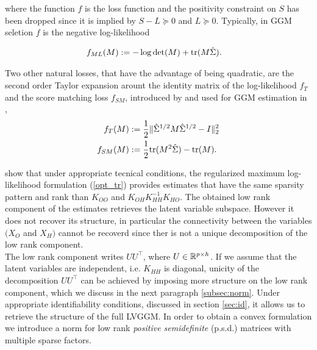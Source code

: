 where the function $f$ is the loss function and the positivity constraint on $S$ has been dropped since it is implied by $S-L \succeq 0$ and $L \succeq 0$. Typically, in GGM seletion $f$ is the negative log-likelihood

\begin{align}
f_{ML}(M)&:=-\log\det(M) + {\rm tr}(M\hat{\Sigma}).
\end{align}

 
Two other natural losses, that have the advantage of being quadratic, are the second order Taylor expansion arount the identity matrix of the log-likelihood $f_{T}$ and the score matching loss $f_{SM}$, introduced by \citet{hyvarinen2005estimation} and used for GGM estimation in \citet{lin2016estimation},
\begin{align}
f_{T}(M)&:=\frac{1}{2}\|\hat{\Sigma}^{1/2}M\hat{\Sigma}^{1/2}-I\|_2^2\\
f_{SM}(M)&:=\frac{1}{2}{\rm tr}(M^2 \hat{\Sigma})-{\rm tr}(M).
\end{align}

\citet{chandrasekaran2010} show that under appropriate tecnical conditions, the regularized maximum log-likelihood formulation (\ref{opt_tr}) provides estimates  that have the same sparsity pattern and rank than $K_{OO}$ and $K_{OH}K_{HH}^{-1}K_{HO}$. The obtained low rank component of the estimates retrieves the latent variable subspace. However it does not recover its structure, in particular the connectivity between the variables $(X_{O}$ and $X_{H})$ cannot be recoverd since ther is not a unique decomposition of the low rank component.\\

The low rank component writes $UU^{\top}$, where $U\in\mathbb{R}^{p\times h}$. If we assume that the latent variables are independent, i.e. $K_{HH}$ is  diagonal,  unicity of the decomposition $UU^{\top}$ can be achieved by imposing more structure on the low rank component, which we discuss in the next paragraph \ref{subsec:norm}. Under appropriate identifiability conditions, discussed in section \ref{sec:id}, it allows us to retrieve the structure of the full LVGGM. In order to obtain a convex formulation we introduce a norm for low rank \textit{positive semidefinite} (p.s.d.) matrices with multiple sparse factors. 

